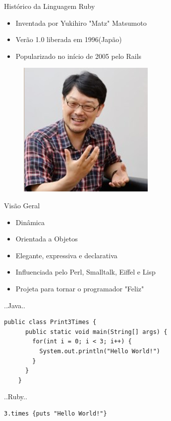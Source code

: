 
\begin{frame}[fragile,t]{Histórico da Linguagem Ruby}
  \begin{itemize}
    \item Inventada por Yukihiro "Matz" Matsumoto
    \item Verão 1.0 liberada em 1996(Japão)
    \item Popularizado no início de 2005 pelo Rails
  \end{itemize}   
  \begin{figure}[hbt]
    \includegraphics[scale=.5]{imagens/matz.png}
  \end{figure}
\end{frame}

\begin{frame}[fragile,t]{Visão Geral}
  \begin{itemize}
    \item Dinâmica
    \item Orientada a Objetos
    \item Elegante, expressiva e declarativa
    \item Influenciada pelo Perl, Smalltalk, Eiffel e Lisp
    \item Projeta para tornar o programador "Feliz"
  \end{itemize}   
\end{frame}

\begin{frame}[fragile,t]{..Java..}
  \begin{lstlisting}[style=JavaInputStyle]
    public class Print3Times {
      public static void main(String[] args) {
        for(int i = 0; i < 3; i++) {
          System.out.println("Hello World!")
        }
      }
    }
  \end{lstlisting}
\end{frame}

\begin{frame}[fragile,t]{..Ruby..}
  \begin{lstlisting}[style=RubyInputStyle]
    3.times {puts "Hello World!"}
  \end{lstlisting}
\end{frame}

